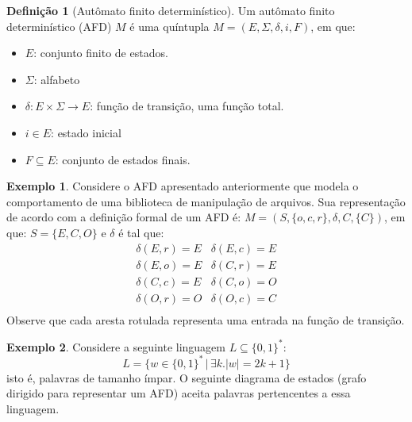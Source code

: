 \documentclass[a4paper]{article}
\theoremstyle{definition}
\newtheorem{Example}{Exemplo}
\newtheorem{Definition}{Definição}
\begin{document}
  \begin{Definition}[Autômato finito determinístico]
    Um autômato finito determinístico (AFD) $M$ é uma quíntupla $M =
    (E,\Sigma,\delta,i,F)$, em que:
    \begin{itemize}
      \item $E$: conjunto finito de estados.
      \item $\Sigma$: alfabeto
      \item $\delta : E \times \Sigma \to E$: função de transição, uma
        função total.
      \item $i \in E$: estado inicial
      \item $F\subseteq E$: conjunto de estados finais.
    \end{itemize}
  \end{Definition}

  \begin{Example}
    Considere o AFD apresentado anteriormente que modela o comportamento
    de uma biblioteca de manipulação de arquivos. Sua representação de
    acordo com a definição formal de um AFD é: $M=(S,\{o,c,r\},\delta,C,\{C\})$,
    em que: $S = \{E,C,O\}$ e $\delta$ é tal que:
    \[
      \begin{array}{ll}
        \delta(E,r) = E & \delta(E,c) = E \\
        \delta(E,o) = E & \delta(C,r) = E \\
        \delta(C,c) = E & \delta(C,o) = O \\
        \delta(O,r) = O & \delta(O,c) = C \\
      \end{array}
    \]
    Observe que cada aresta rotulada representa uma entrada na
    função de transição. 
  \end{Example}

  \begin{Example}\label{afdimpar}
    Considere a seguinte linguagem $L\subseteq \{0,1\}^*$:
    \[
      L = \{w \in\{0,1\}^*\,|\, \exists k. |w| = 2k + 1\}
    \]
    isto é, palavras de tamanho ímpar. O seguinte diagrama de estados
    (grafo dirigido para representar um AFD) aceita palavras pertencentes
    a essa linguagem.
    \begin{figure}[ht]
      \centering
    \end{figure}
  \end{Example}
\end{document}
